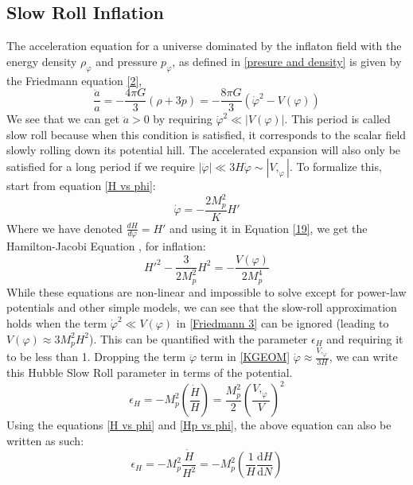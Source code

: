 \documentclass[aps,prd,reprint,preprintnumbers,showpacs,floatfix,nofootinbib,superscript address]{revtex4-2}
\begin{document}
\subsection{Slow Roll Inflation} \label{Slow Roll Inflation}
The acceleration equation for a universe dominated by the inflaton field with the energy density $\rho_{\varphi}$ and pressure $p_{\varphi}$, as defined in \ref{presure and density} is given by the Friedmann equation \ref{2},
\begin{equation}
    \frac{\ddot{a}}{a} = -\frac{4\pi G}{3} (\rho +3p) = -\frac{8\pi G}{3} ({\dot{\varphi}}^2 - V(\varphi)) 
\end{equation}
We see that we can get $\ddot{a} > 0$ by requiring $\dot{\varphi}^2 \ll |V(\varphi)|$. This period is called slow roll because when this condition is satisfied, it corresponds to the scalar field slowly rolling down its potential hill. The accelerated expansion will also only be satisfied for a long period if we require $|\ddot{\varphi}| \ll 3H\dot{\varphi} \sim |V,_{\varphi}|$. To formalize this, start from equation \ref{H vs phi}:
\begin{equation} \label{Hp vs phi}
    \dot{\varphi}  = -  \frac{2 M_p^2}{K} H'
\end{equation}
Where we have denoted $\frac{dH}{d\varphi} = H'$ and using it in Equation \ref{19}, we get the Hamilton-Jacobi Equation \cite{copeland1993reconstructing}, \cite{salopek1990nonlinear} for inflation:
\begin{equation}    \label{Hamilton-Jacobi}
    H'^2 - \frac{3}{2M_p^2}H^2 = - \frac{V(\varphi)}{2M_p^4} 
\end{equation}
While these equations are non-linear and impossible to solve except for power-law potentials and other simple models, we can see that the slow-roll approximation holds when the term $\dot{\varphi}^2 \ll V(\varphi)$ in \ref{Friedmann 3} can be ignored (leading to $V(\varphi) \approx 3M_p^2H^2$). This can be quantified with the parameter $\epsilon_H$ and requiring it to be less than 1. Dropping the term $\ddot{\varphi}$ term in \ref{KGEOM} $\dot{\varphi} \approx \frac{V,_\varphi}{3H}$, we can write this Hubble Slow Roll parameter in terms of the potential.
\begin{equation}
    \epsilon_H = - M_p^2 \left(\frac{\dot{H}}{H} \right) = \frac{M_p^2}{2} \left(\frac{V,_\varphi}{V}\right)^2
\end{equation}
Using the equations \ref{H vs phi} and \ref{Hp vs phi}, the above equation can also be written as such:
\begin{equation} \label{26}
    \epsilon_H = - M_p^2  \frac{\dot{H}}{H^2} = - M_p^2 \left(\frac{1}{H}\frac{\text{d}H}{\text{d}N} \right)
\end{equation}
\end{document}
